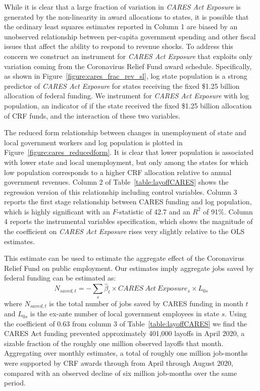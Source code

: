 While it is clear that a large fraction of variation in \emph{CARES Act Exposure} is generated by the non-linearity in award allocations to states, it is possible that the ordinary least squares estimates reported in Column 1 are biased by an unobserved relationship between per-capita government spending and other fiscal issues that affect the ability to respond to revenue shocks. To address this concern we construct an instrument for \emph{CARES Act Exposure} that exploits only variation coming from the Coronavirus Relief Fund award schedule. Specifically, as shown in Figure~\ref{figure:cares_frac_rev_sl}, log state population is a strong predictor of \emph{CARES Act Exposure} for states receiving the fixed \$1.25 billion allocation of federal funding. We instrument for \emph{CARES Act Exposure} with log population, an indicator of if the state received the fixed \$1.25 billion allocation of CRF funds, and the interaction of these two variables.   

The reduced form relationship between changes in unemployment of state and local government workers and log population is plotted in Figure~\ref{figure:cares_reducedform}. It is clear that lower population is associated with lower state and local unemployment, but only among the states for which low population corresponds to a higher CRF allocation relative to annual government revenues. Column 2 of Table~\ref{table:layoffCARES} shows the regression version of this relationship including control variables. Column 3 reports the first stage relationship between CARES funding and log population, which is highly significant with an $F$-statistic of 42.7 and an $R^2$ of 91\%. Column 4 reports the instrumental variables specification, which shows the magnitude of the coefficient on \emph{CARES Act Exposure} rises very slightly relative to the OLS estimates. 

This estimate can be used to estimate the aggregate effect of the Coronavirus Relief Fund on public employment. Our estimates imply aggregate jobs saved by federal funding can be estimated as:
\begin{equation*}
N_{saved,t} = -\sum_s{\hat\beta_t\times {CARES \  Act \  Exposure_s} \times L_{0s}} 
\end{equation*}
where $N_{saved,t}$ is the total number of jobs saved by CARES funding in month $t$ and $L_{0s}$ is the ex-ante number of local government employees in state $s$. Using the coefficient of 0.63 from column 3 of Table~\ref{table:layoffCARES} we find the CARES Act funding prevented approximately 401,000 layoffs in April 2020, a sizable fraction of the roughly one million observed layoffs that month. Aggregating over monthly estimates, a total of roughly one million job-months were supported by CRF awards through from April through August 2020, compared with an observed decline of six million job-months over the same period. 


